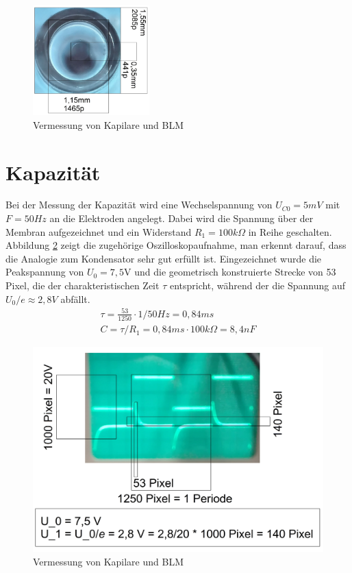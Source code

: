 \documentclass{include/thesisclass3}
\begin{document}
\begin{figure}[ht]
	\begin{center}
		\includegraphics[width=0.4\textwidth]{images/Perle2.png}
		\caption{Vermessung von Kapilare und BLM}
		\label{Perle}
	\end{center}
\end{figure}

\section{Kapazität}
Bei der Messung der Kapazität wird eine Wechselspannung von $U_{C0}=5mV$ mit $F=50Hz$ an die Elektroden angelegt. Dabei wird die Spannung über der Membran aufgezeichnet und ein Widerstand $R_1=100k\Omega$ in Reihe geschalten. Abbildung \ref{oszi} zeigt die zugehörige Oszilloskopaufnahme, man erkennt darauf, dass die Analogie zum Kondensator sehr gut erfüllt ist. Eingezeichnet wurde die Peakspannung von $U_0 = 7,5$V und die geometrisch konstruierte Strecke von 53 Pixel, die der charakteristischen Zeit $\tau$ entspricht, während der die Spannung auf $U_0/\textit{e}\approx 2,8V$ abfällt.
\begin{align*}
\tau = \frac{53}{1250} \cdot 1/50 Hz= 0,84 ms\\
C=\tau / R_1 = 0,84ms \cdot 100k\Omega = 8,4 nF
\end{align*}
\begin{figure}[ht]
	\begin{center}
		\includegraphics[width=1\textwidth]{images/measure.png}
		\caption{Vermessung von Kapilare und BLM}
		\label{oszi}
	\end{center}
\end{figure}




\begin{itemize}
\end{itemize}
\end{document}
